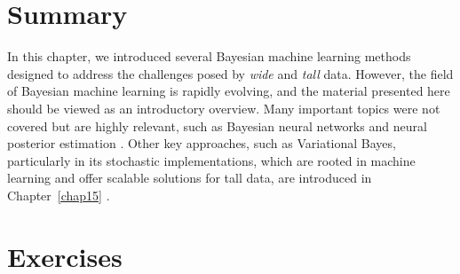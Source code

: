 \section{Summary}\label{13_6}

In this chapter, we introduced several Bayesian machine learning methods designed to address the challenges posed by \textit{wide} and \textit{tall} data. However, the field of Bayesian machine learning is rapidly evolving, and the material presented here should be viewed as an introductory overview. Many important topics were not covered but are highly relevant, such as Bayesian neural networks \cite{neal2012bayesian} and neural posterior estimation \cite{papamakarios2016fast,lueckmann2017flexible,greenberg2019automatic}. Other key approaches, such as Variational Bayes, particularly in its stochastic implementations, which are rooted in machine learning and offer scalable solutions for tall data, are introduced in Chapter~\ref{chap15} \cite{wainwright2008graphical}.

\section{Exercises}\label{13_7}

